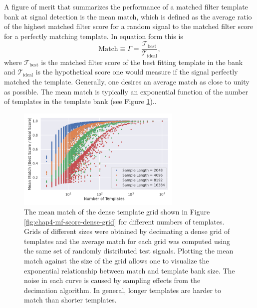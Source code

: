 A figure of merit that summarizes the performance of a matched filter template bank at signal detection is the mean match, which is defined as the average ratio of the highest matched filter score for a random signal to the matched filter score for a perfectly matching template. In equation form this is 
\begin{equation}
    \textrm{Match}\equiv\Gamma=\frac{\mathcal{T}_\mathrm{best}}{\mathcal{T}_\textrm{ideal}},
\end{equation}
where $\mathcal{T}_\textrm{best}$ is the matched filter score of the best fitting template in the bank and $\mathcal{T}_\textrm{ideal}$ is the hypothetical score one would measure if the signal perfectly matched the template. Generally, one desires an average match as close to unity as possible. The mean match is typically an exponential function of the number of templates in the template bank (see Figure \ref{fig:chap4-mean-match-dense-grid})..
\begin{figure}[htbp]
    \centering
    \includegraphics*[width=0.7\textwidth]{figs/Chapter-4/220114_mean_match_vs_number_of_templates_87.0_0cm_modify_sample_number.png}
    \caption{\label{fig:chap4-mean-match-dense-grid} The mean match of the dense template grid shown in Figure \ref{fig:chap4-mf-score-dense-grid} for different numbers of templates. Grids of different sizes were obtained by decimating a dense grid of templates and the average match for each grid was computed using the same set of randomly distributed test signals. Plotting the mean match against the size of the grid allows one to visualize the exponential relationship between match and template bank size. The noise in each curve is caused by sampling effects from the decimation algorithm. In general, longer templates are harder to match than shorter templates.}
\end{figure}

